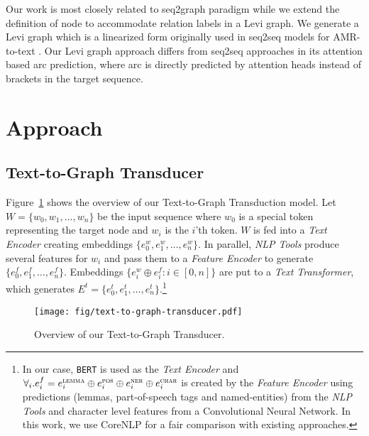 \documentclass[11pt,a4paper]{article}
\begin{document}
Our work is most closely related to seq2graph paradigm while we extend the definition of node to accommodate relation labels in a Levi graph. We generate a Levi graph which is a linearized form originally used in seq2seq models for AMR-to-text \cite{beck-etal-2018-graph, guo-etal-2019-densely, ribeiro-etal-2019-enhancing}. Our Levi graph approach differs from seq2seq approaches in its attention based arc prediction, where arc is directly predicted by attention heads instead of brackets in the target sequence. \section{Approach}
\label{sec:approach}





\subsection{Text-to-Graph Transducer}
\label{ssec:text-to-graph-transducer}

\noindent Figure~\ref{fig:text-to-graph-transducer} shows the overview of our Text-to-Graph Transduction model.
Let $W = \{w_0, w_1, \ldots, w_{n}\}$ be the input sequence where $w_0$ is a special token representing 
the target node and $w_i$ is the $i$'th token.
$W$ is fed into a \textit{Text Encoder} creating embeddings $\{e^w_0, e^w_1, \ldots, e^w_{n}\}$.
In parallel, \textit{NLP Tools} produce several features for $w_i$ and pass them to a \textit{Feature Encoder} to generate $\{e^f_0, e^f_1, \ldots, e^f_{n}\}$.
Embeddings $\{e^{w}_i \oplus e^f_i : i \in [0, n]\}$ are put to a \textit{Text Transformer}, which generates $E^t = \{e^t_0, e^t_1, \ldots, e^t_n\}$.\footnote{In our case, \texttt{BERT} \cite{devlin-etal-2019-bert} is used as the \textit{Text Encoder} and $\forall_i. e^f_i = e^{\textsc{lemma}}_i \oplus e^{\textsc{pos}}_i \oplus e^{\textsc{ner}}_i \oplus e^{\textsc{char}}_i$ is created by the \textit{Feature Encoder} using predictions (lemmas, part-of-speech tags and named-entities) from the \textit{NLP Tools} and character level features from a Convolutional Neural Network. In this work, we use CoreNLP \cite{manning2014stanford} for a fair comparison with existing approaches.}

\begin{figure}[htbp!]
\centering
\texttt{[image: fig/text-to-graph-transducer.pdf]}
\caption{Overview of our Text-to-Graph Transducer.}
\label{fig:text-to-graph-transducer}
\end{figure}
\end{document}
